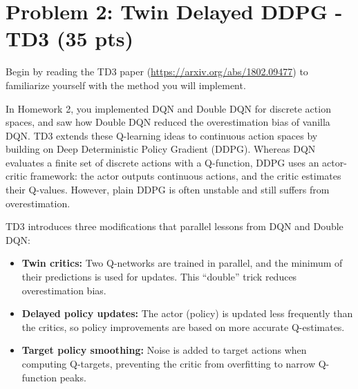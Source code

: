 \documentclass[12pt]{article}
\begin{document}




\newpage


\section*{Problem 2: Twin Delayed DDPG - TD3 (35 pts)}

Begin by reading the TD3 paper (\url{https://arxiv.org/abs/1802.09477}) to familiarize yourself with the method you will implement.

In Homework 2, you implemented DQN and Double DQN for discrete action spaces, and saw how Double DQN reduced the overestimation bias of vanilla DQN. TD3 extends these Q-learning ideas to continuous action spaces by building on Deep Deterministic Policy Gradient (DDPG). Whereas DQN evaluates a finite set of discrete actions with a Q-function, DDPG uses an actor-critic framework: the actor outputs continuous actions, and the critic estimates their Q-values. However, plain DDPG is often unstable and still suffers from overestimation.

TD3 introduces three modifications that parallel lessons from DQN and Double DQN:
\begin{itemize}
    \item \textbf{Twin critics:} Two Q-networks are trained in parallel, and the minimum of their predictions is used for updates. This “double” trick reduces overestimation bias.
    \item \textbf{Delayed policy updates:} The actor (policy) is updated less frequently than the critics, so policy improvements are based on more accurate Q-estimates.
    \item \textbf{Target policy smoothing:} Noise is added to target actions when computing Q-targets, preventing the critic from overfitting to narrow Q-function peaks.
\end{itemize}
\end{document}
